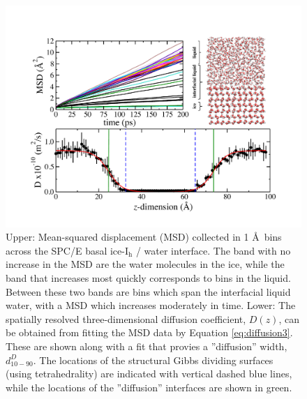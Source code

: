 \begin{figure}
\includegraphics[width=\linewidth]{Figures/DzSPCE}
\caption{\label{fig:DzSPCE} Upper: Mean-squared displacement (MSD)
  collected in 1 \AA~bins across the SPC/E basal ice-I$_\mathrm{h}$ /
  water interface. The band with no increase in the MSD are the water
  molecules in the ice, while the band that increases most quickly
  corresponds to bins in the liquid. Between these two bands are bins
  which span the interfacial liquid water, with a MSD which increases
  moderately in time. Lower: The spatially resolved three-dimensional
  diffusion coefficient, $D(z)$, can be obtained from fitting the MSD
  data by Equation \eqref{eq:diffusion3}. These are shown along with a fit
  that provies a ''diffusion'' width, $d_{10-90}^{D}$. The locations
  of the structural Gibbs dividing surfaces (using tetrahedrality) are
  indicated with vertical dashed blue lines, while the locations of
  the ''diffusion'' interfaces are shown in green.  }
\end{figure}

